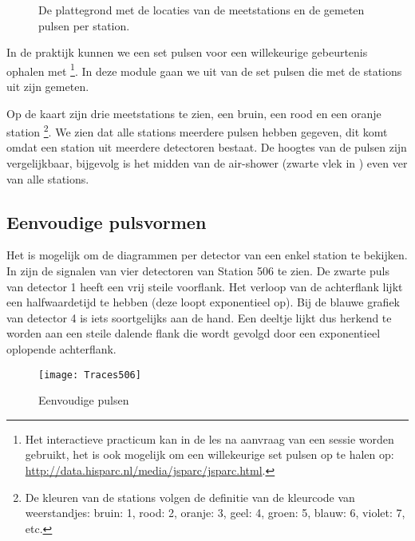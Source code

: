 \begin{figure}[ht]
    \centering
    \caption{De plattegrond met de locaties van de meetstations
             en de gemeten pulsen per station.}
    \label{fig:coincidence}
\end{figure}

In de praktijk kunnen we een set pulsen voor een willekeurige
gebeurtenis ophalen met \jsparc%
\footnote{Het interactieve practicum \jsparc kan in de les na aanvraag
van een sessie worden gebruikt, het is ook mogelijk om een willekeurige
set pulsen op te halen op:
\url{http://data.hisparc.nl/media/jsparc/jsparc.html}.%
}. In deze module gaan we uit van de set pulsen die met de stations
uit  zijn gemeten.

Op de kaart zijn drie meetstations te zien, een bruin, een rood en een
oranje station%
\footnote{De kleuren van de stations volgen de definitie van de
kleurcode van weerstandjes: bruin: 1, rood: 2, oranje: 3, geel: 4,
groen: 5, blauw: 6, violet: 7, etc. %
}. We zien dat alle stations meerdere pulsen hebben gegeven, dit komt
omdat een station uit meerdere detectoren bestaat. De hoogtes van de
pulsen zijn vergelijkbaar, bijgevolg is het midden van de air-shower
(zwarte vlek in ) even ver van alle stations.


\subsection{Eenvoudige pulsvormen}

Het is mogelijk om de diagrammen per detector van een enkel station
te bekijken. In  zijn de signalen
van vier detectoren van Station 506 te zien. De zwarte puls van detector
1 heeft een vrij steile voorflank. Het verloop van de achterflank
lijkt een halfwaardetijd te hebben (deze loopt exponentieel op). Bij
de blauwe grafiek van detector 4 is iets soortgelijks aan de hand.
Een deeltje lijkt dus herkend te worden aan een steile dalende flank
die wordt gevolgd door een exponentieel oplopende achterflank.

\begin{figure}[ht]
    \centering
    \texttt{[image: Traces506]}
    \caption{Eenvoudige pulsen}
    \label{fig:Eenvoudige-pulsen}
\end{figure}


